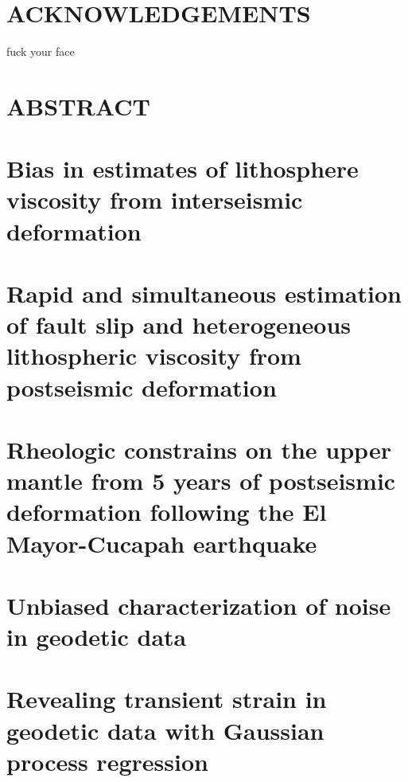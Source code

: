 \documentclass[letterpaper,12pt,oneside]{book}
\begin{document}
\chapter*{ACKNOWLEDGEMENTS}

fuck your face

\newpage

\tableofcontents
\listoffigures{}
\listoftables{}

\chapter*{ABSTRACT}

\mainmatter

\chapter{Bias in estimates of lithosphere viscosity from interseismic deformation}

\chapter{Rapid and simultaneous estimation of fault slip and heterogeneous lithospheric viscosity from postseismic deformation}

\chapter{Rheologic constrains on the upper mantle from 5 years of postseismic deformation following the El Mayor-Cucapah earthquake}

\chapter{Unbiased characterization of noise in geodetic data}


\chapter{Revealing transient strain in geodetic data with Gaussian process regression} 

\end{document}
